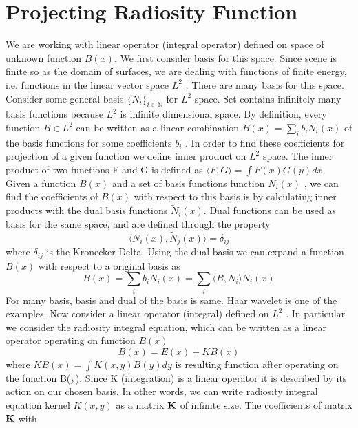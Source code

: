 \section{Projecting Radiosity Function}
We are working with linear operator (integral operator) defined on space of unknown function $B(x)$.  We first consider basis for this space. Since scene is finite so as the domain of surfaces, we are dealing with functions of finite energy, i.e. functions
in the linear vector space $L^2$ . There are many basis for
this space. Consider some general basis $\{N_i \}_{i \in \mathbb{N}}$ for $L^2$ space. Set contains infinitely many basis functions because $L^2$ is infinite dimensional space.
By definition, every function $B \in L^2$ can be written as a linear combination  $B(x) = \sum _i b_i N_i(x)$ of the basis functions for
some coefficients $b_i$ . In order to find these coefficients for projection of a given
function we define inner product on $L^2$ space. The inner product of
two functions F and G is defined as $\langle F, G \rangle  = \int F(x) G(y) dx$.
Given a function $B(x)$ and a set of basis functions function $N_i(x)$ , we can find the coefficients of $B(x)$ with respect to this basis is by
calculating inner products with the dual basis functions $\tilde{N}_i(x)$. Dual functions can be used as basis for the same space, and are defined
through the property
\begin{equation}
\langle N_i(x),\tilde{N}_j(x) \rangle =\delta_{ij}
\end{equation}
where $\delta_{ij}$ is the Kronecker Delta. Using the dual basis we can expand a function  $B(x)$ with respect to a original basis as
\begin{equation}
B(x) = \sum_ib_iN_i(x)= \sum_i\langle B,N_i \rangle N_i(x)
\end{equation}
For many basis, basis and dual of the basis is same. Haar wavelet is one of the examples. 
Now consider a linear operator (integral) defined on $L^2$ . In particular we consider the radiosity
integral equation, which can be written as a linear operator operating on function $B(x)$\\
\begin{equation}
B(x)=E(x)+KB(x)
\end{equation}
where $KB(x) = \int K(x, y)B(y)dy$ is resulting function after operating on the function B(y). Since K (integration) is a linear operator it
is described by its action on our chosen basis. In other words, we
can write radiosity integral equation  kernel $K(x,y)$ as a matrix $\bf{K}$ of  infinite size. The coefficients of matrix $\bf{K}$  with
